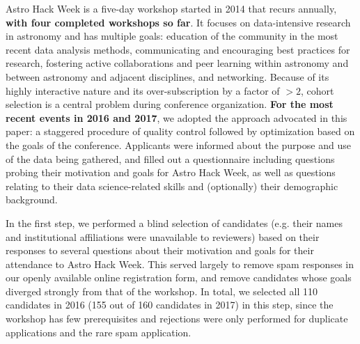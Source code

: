 \documentclass[12pt]{article}
\begin{document}
Astro Hack Week is a five-day workshop started in 2014 that recurs annually, \textbf{with four completed workshops so far}. It focuses on data-intensive research in astronomy and has multiple goals: education of the community in the most recent data analysis methods, communicating and encouraging best practices for research, fostering active collaborations and peer learning within astronomy and between astronomy and adjacent disciplines, and networking. Because of its highly interactive nature and its over-subscription by a factor of $>2$, cohort selection is a central problem during conference organization. \textbf{For the most recent events in 2016 and 2017}, we adopted the approach advocated in this paper: a staggered procedure of quality control followed by optimization based on the goals of the conference. Applicants were informed about the purpose and use of the data being gathered, and filled out a questionnaire including questions probing their motivation and goals for Astro Hack Week, as well as questions relating to their data science-related skills and (optionally) their demographic background.

In the first step, we performed a blind selection of candidates (e.g. their names and institutional affiliations were unavailable to reviewers) based on their responses to several questions about their motivation and goals for their attendance to Astro Hack Week. This served largely to remove spam responses in our openly available online registration form, and remove candidates whose goals diverged strongly from that of the workshop. In total, we selected all 110 candidates in 2016 (155 out of 160 candidates in 2017) in this step, since the workshop has few prerequisites and rejections were only performed for duplicate applications and the rare spam application.
\end{document}

